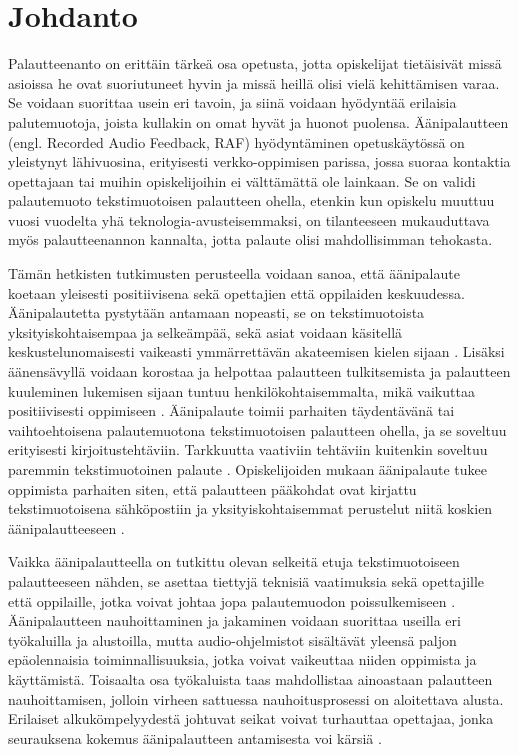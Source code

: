 \documentclass[utf8]{gradu3}
\begin{document}
\mainmatter

\chapter{Johdanto}

Palautteenanto on erittäin tärkeä osa opetusta, jotta opiskelijat tietäisivät missä asioissa he ovat suoriutuneet hyvin ja missä heillä olisi vielä kehittämisen varaa. Se voidaan suorittaa usein eri tavoin, ja siinä voidaan hyödyntää erilaisia palutemuotoja, joista kullakin on omat hyvät ja huonot puolensa. Äänipalautteen (engl. Recorded Audio Feedback, RAF) hyödyntäminen opetuskäytössä on yleistynyt lähivuosina, erityisesti verkko-oppimisen parissa, jossa suoraa kontaktia opettajaan tai muihin opiskelijoihin ei välttämättä ole lainkaan. Se on validi palautemuoto tekstimuotoisen palautteen ohella, etenkin kun opiskelu muuttuu vuosi vuodelta yhä teknologia-avusteisemmaksi, on tilanteeseen mukauduttava myös palautteenannon kannalta, jotta palaute olisi mahdollisimman tehokasta.

Tämän hetkisten tutkimusten perusteella voidaan sanoa, että äänipalaute koetaan yleisesti positiivisena sekä opettajien että oppilaiden keskuudessa. Äänipalautetta pystytään antamaan nopeasti, se on tekstimuotoista yksityiskohtaisempaa ja selkeämpää, sekä asiat voidaan käsitellä keskustelunomaisesti vaikeasti ymmärrettävän akateemisen kielen sijaan \parencite[][]{developing}. Lisäksi äänensävyllä voidaan korostaa ja helpottaa palautteen tulkitsemista ja palautteen kuuleminen lukemisen sijaan tuntuu henkilökohtaisemmalta, mikä vaikuttaa positiivisesti oppimiseen \parencite[][]{attitudes}. Äänipalaute toimii parhaiten täydentävänä tai vaihtoehtoisena palautemuotona tekstimuotoisen palautteen ohella, ja se soveltuu erityisesti kirjoitustehtäviin. Tarkkuutta vaativiin tehtäviin kuitenkin soveltuu paremmin tekstimuotoinen palaute \parencite[][]{academics}. Opiskelijoiden mukaan äänipalaute tukee oppimista parhaiten siten, että palautteen pääkohdat ovat kirjattu tekstimuotoisena sähköpostiin ja yksityiskohtaisemmat perustelut niitä koskien äänipalautteeseen \parencite[][]{using}.

Vaikka äänipalautteella on tutkittu olevan selkeitä etuja tekstimuotoiseen palautteeseen nähden, se asettaa tiettyjä teknisiä vaatimuksia sekä opettajille että oppilaille, jotka voivat johtaa jopa palautemuodon poissulkemiseen \parencite[][]{developing}. Äänipalautteen nauhoittaminen ja jakaminen voidaan suorittaa useilla eri työkaluilla ja alustoilla, mutta audio-ohjelmistot sisältävät yleensä paljon epäolennaisia toiminnallisuuksia, jotka voivat vaikeuttaa niiden oppimista ja käyttämistä. Toisaalta osa työkaluista taas mahdollistaa ainoastaan palautteen nauhoittamisen, jolloin virheen sattuessa nauhoitusprosessi on aloitettava alusta. Erilaiset alkukömpelyydestä johtuvat seikat voivat turhauttaa opettajaa, jonka seurauksena kokemus äänipalautteen antamisesta voi kärsiä \parencite[][]{versus}.
\end{document}
